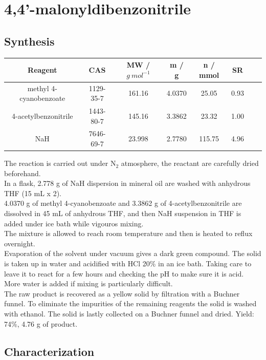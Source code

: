 \documentclass[../Master.tex]{subfiles}
\begin{document}
\section{4,4'-malonyldibenzonitrile}
\subsection{Synthesis}
\begin{center}
	\begin{tabular}[b]{cccccccc}
		\toprule
		Reagent                & CAS       & MW / \(g \ mol^{-1}\) & m / g  & n / mmol & SR   \\
		\midrule
		methyl 4-cyanobenzoate & 1129-35-7 & 161.16                & 4.0370 & 25.05    & 0.93 \\
		4-acetylbenzonitrile   & 1443-80-7 & 145.16                & 3.3862 & 23.32    & 1.00 \\
		NaH                    & 7646-69-7 & 23.998                & 2.7780 & 115.75   & 4.96 \\
		\bottomrule
	\end{tabular}
\end{center}
The reaction is carried out under N$_{2}$ atmosphere, the reactant are carefully dried beforehand.\\
In a flask, 2.778 g of NaH dispersion in mineral oil are washed with anhydrous THF (15 mL x 2).\\
4.0370 g of methyl 4-cyanobenzoate and 3.3862 g of 4-acetylbenzonitrile are dissolved in 45 mL of anhydrous THF, and then NaH suspension in THF is added under ice bath while vigouros mixing. \\
The mixture is allowed to reach room temperature and then is heated to reflux overnight. \\
Evaporation of the solvent under vacuum gives a dark green compound. The solid is taken up in water and acidified with HCl 20\% in an ice bath. Taking care to leave it to react for a few hours and checking the pH to make sure it is acid. More water is added if mixing is particularly difficult.\\
The raw product is recovered as a yellow solid by filtration with a Buchner funnel.
To eliminate the impurities of the remaining reagents the solid is washed with ethanol. The solid is lastly collected on a Buchner funnel and dried. Yield: 74\%, 4.76 g of product.
\pagebreak

\subsection{Characterization}
\end{document}
